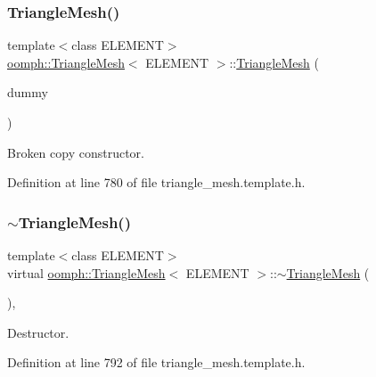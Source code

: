 \subsubsection{\texorpdfstring{Triangle\+Mesh()}{TriangleMesh()}\hspace{0.1cm}{\footnotesize\ttfamily [5/5]}}
{\footnotesize\ttfamily template$<$class E\+L\+E\+M\+E\+NT$>$ \\
\hyperlink{classoomph_1_1TriangleMesh}{oomph\+::\+Triangle\+Mesh}$<$ E\+L\+E\+M\+E\+NT $>$\+::\hyperlink{classoomph_1_1TriangleMesh}{Triangle\+Mesh} (\begin{DoxyParamCaption}\item[{const \hyperlink{classoomph_1_1TriangleMesh}{Triangle\+Mesh}$<$ E\+L\+E\+M\+E\+NT $>$ \&}]{dummy }\end{DoxyParamCaption})\hspace{0.3cm}{\ttfamily [inline]}}



Broken copy constructor. 



Definition at line 780 of file triangle\+\_\+mesh.\+template.\+h.

\mbox{\label{classoomph_1_1TriangleMesh_a1b3d8cb528c25a53faa38164600f256d}} 
\subsubsection{\texorpdfstring{$\sim$\+Triangle\+Mesh()}{~TriangleMesh()}}
{\footnotesize\ttfamily template$<$class E\+L\+E\+M\+E\+NT$>$ \\
virtual \hyperlink{classoomph_1_1TriangleMesh}{oomph\+::\+Triangle\+Mesh}$<$ E\+L\+E\+M\+E\+NT $>$\+::$\sim$\hyperlink{classoomph_1_1TriangleMesh}{Triangle\+Mesh} (\begin{DoxyParamCaption}{ }\end{DoxyParamCaption})\hspace{0.3cm}{\ttfamily [inline]}, {\ttfamily [virtual]}}



Destructor. 



Definition at line 792 of file triangle\+\_\+mesh.\+template.\+h.



